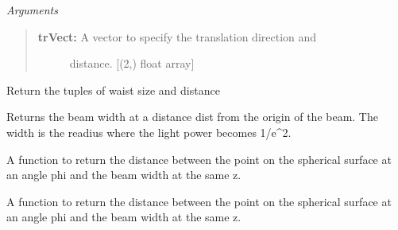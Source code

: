 \documentclass[letterpaper,10pt,english]{sphinxmanual}
\begin{document}
\begin{fulllineitems}
\begin{fulllineitems}
\begin{description}
\end{description}

\emph{Arguments}
\begin{quote}
\begin{description}
\item[{\textbf{trVect:} A vector to specify the translation direction and}] \leavevmode
distance. {[}(2,) float array{]}

\end{description}
\end{quote}

\end{fulllineitems}


\begin{fulllineitems}
\label{api/gtrace:gtrace.beam.GaussianBeam.waist}
Return the tuples of waist size and distance

\end{fulllineitems}


\begin{fulllineitems}
\label{api/gtrace:gtrace.beam.GaussianBeam.width}
Returns the beam width at a distance dist
from the origin of the beam.
The width is the readius where the light power becomes 1/e\textasciicircum{}2.

\end{fulllineitems}


\end{fulllineitems}


\begin{fulllineitems}
\label{api/gtrace:gtrace.beam.optFunForEndPointR}
A function to return the distance between the point on
the spherical surface at an angle phi and the beam width
at the same z.

\end{fulllineitems}


\begin{fulllineitems}
\label{api/gtrace:gtrace.beam.optFunForFlat}
A function to return the distance between the point on
the spherical surface at an angle phi and the beam width
at the same z.

\end{fulllineitems}
\end{document}
